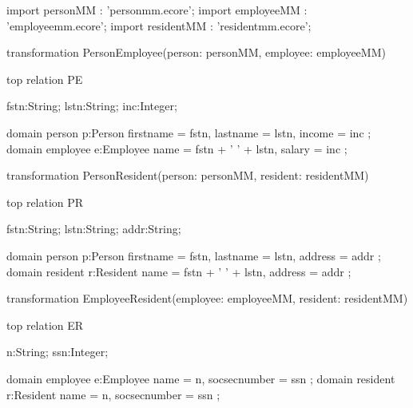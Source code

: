 import personMM   : 'personmm.ecore';
import employeeMM : 'employeemm.ecore';
import residentMM : 'residentmm.ecore';

transformation PersonEmployee(person: personMM,	employee: employeeMM) {
	top relation PE {
		fstn:String; lstn:String; inc:Integer;

		domain person p:Person {
			firstname = fstn, lastname = lstn, income = inc
		};
		domain employee e:Employee {
			name = fstn + ' ' + lstn, salary = inc
		};
	}
}

transformation PersonResident(person: personMM,	resident: residentMM) {
	top relation PR {
		fstn:String; lstn:String; addr:String;

		domain person p:Person {
			firstname = fstn, lastname = lstn, address = addr
		};
		domain resident r:Resident {
			name = fstn + ' ' + lstn, address = addr
		};
	}
}

transformation EmployeeResident(employee: employeeMM, resident: residentMM) {
	top relation ER {
		n:String; ssn:Integer;

		domain employee e:Employee {
			name = n, socsecnumber = ssn
		};
		domain resident r:Resident {
			name = n, socsecnumber = ssn
		};
	}
}